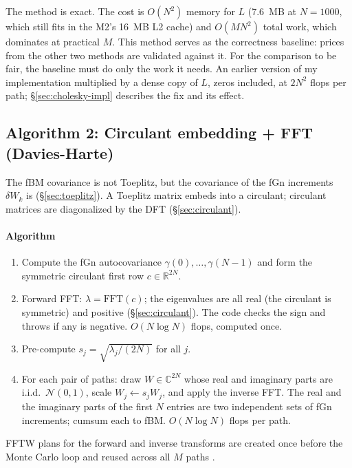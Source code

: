 The method is exact.  The cost is $O(N^2)$ memory for $L$ (7.6~MB at $N=1000$,
which still fits in the M2's 16~MB L2 cache) and $O(MN^2)$ total work, which
dominates at practical $M$.  This method serves as the correctness baseline:
prices from the other two methods are validated against it.  For the comparison
to be fair, the baseline must do only the work it needs.  An earlier version of my
implementation multiplied by a dense copy of $L$, zeros included, at $2N^2$ flops
per path; §\ref{sec:cholesky-impl} describes the fix and its effect.

\subsection{Algorithm 2: Circulant embedding + FFT (Davies-Harte)}
\label{sec:fft}

The fBM covariance is not Toeplitz, but the covariance of the fGn
increments $\delta W_k$ is (§\ref{sec:toeplitz}). A Toeplitz matrix embeds
into a circulant; circulant matrices are diagonalized by the DFT
(§\ref{sec:circulant}).

\paragraph{Algorithm}
\begin{enumerate}
  \item Compute the fGn autocovariance $\gamma(0), \ldots, \gamma(N-1)$ and form the
        symmetric circulant first row $c \in \mathbb{R}^{2N}$.
  \item Forward FFT: $\lambda = \mathrm{FFT}(c)$; the eigenvalues are all real
        (the circulant is symmetric) and positive (§\ref{sec:circulant}).  The
        code checks the sign and throws if any is negative.
        $O(N\log N)$ flops, computed once.
  \item Pre-compute $s_j = \sqrt{\lambda_j / (2N)}$ for all $j$.
  \item For each pair of paths: draw $W \in \mathbb{C}^{2N}$ whose real and imaginary
        parts are i.i.d.\ $\mathcal{N}(0,1)$, scale $W_j \leftarrow s_j W_j$, and apply
        the inverse FFT.  The real and the imaginary parts of the first $N$ entries
        are two independent sets of fGn increments; cumsum each to fBM.
        $O(N\log N)$ flops per path.
\end{enumerate}
FFTW plans for the forward and inverse transforms are created once before the Monte
Carlo loop and reused across all $M$ paths \citep{frigo2005design}.

